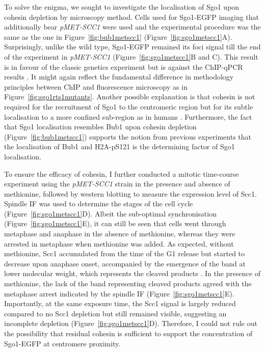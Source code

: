 To solve the enigma, we sought to investigate the localisation of Sgo1 upon cohesin depletion by microscopy method. Cells used for Sgo1-EGFP imaging that additionally bear \textit{pMET-SCC1} were used and the experimental procedure was the same as the one in Figure~\ref{fig:bub1metscc1} (Figure~\ref{fig:sgo1metscc1}A). Surprisingly, unlike the wild type, Sgo1-EGFP remained its foci signal till the end of the experiment in \textit{pMET-SCC1} (Figure~\ref{fig:sgo1metscc1}B and C). This result is in favour of the classic genetics experiment \citep{Indjeian2005a} but is against the ChIP-qPCR results \citep{Verzijlbergen2014}. It might again reflect the fundamental difference in methodology principles between ChIP and fluorescence microscopy as in Figure~\ref{fig:sgo1rts1mutants}. Another possible explanation is that cohesin is not required for the recruitment of Sgo1 to the centromeric region but for its subtle localisation to a more confined sub-region as in humans \citep{Liu2013a}. Furthermore, the fact that Sgo1 localisation resembles Bub1 upon cohesin depletion (Figure~\ref{fig:bub1metscc1}) supports the notion from previous experiments that the localisation of Bub1 and H2A-pS121 is the determining factor of Sgo1 localisation. 

To ensure the efficacy of cohesin, I further conducted a mitotic time-course experiment using the \textit{pMET-SCC1} strain in the presence and absence of methionine, followed by western blotting to measure the expression level of Scc1. Spindle IF was used to determine the stages of the cell cycle (Figure~\ref{fig:sgo1metscc1}D). Albeit the sub-optimal synchronisation (Figure~\ref{fig:sgo1metscc1}E), it can still be seen that cells went through metaphase and anaphase in the absence of methionine, whereas they were arrested in metaphase when methionine was added. As expected, without methionine, Scc1 accumulated from the time of the G1 release but started to decrease upon anaphase onset, accompanied by the emergence of the band at lower molecular weight, which represents the cleaved products \citep{Alexandru2001PhosphorylationYeast}. In the presence of methionine, the lack of the band representing cleaved products agreed with the metaphase arrest indicated by the spindle IF (Figure~\ref{fig:sgo1metscc1}E). Importantly, at the same exposure time, the Scc1 signal is largely reduced compared to no Scc1 depletion but still remained visible, suggesting an incomplete depletion (Figure~\ref{fig:sgo1metscc1}D). Therefore, I could not rule out the possibility that residual cohesin is sufficient to support the concentration of Sgo1-EGFP at centromere proximity. 

